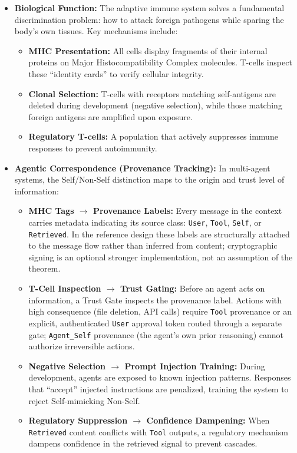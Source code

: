 \begin{itemize}[leftmargin=*]
\item \textbf{Biological Function:} The adaptive immune system solves a fundamental discrimination problem: how to attack foreign pathogens while sparing the body's own tissues. Key mechanisms include:
\begin{itemize}
\item \textbf{MHC Presentation:} All cells display fragments of their internal proteins on Major Histocompatibility Complex molecules. T-cells inspect these ``identity cards'' to verify cellular integrity.
\item \textbf{Clonal Selection:} T-cells with receptors matching self-antigens are deleted during development (negative selection), while those matching foreign antigens are amplified upon exposure.
\item \textbf{Regulatory T-cells:} A population that actively suppresses immune responses to prevent autoimmunity.
\end{itemize}

\item \textbf{Agentic Correspondence (Provenance Tracking):} In multi-agent systems, the Self/Non-Self distinction maps to the origin and trust level of information:
\begin{itemize}
\item \textbf{MHC Tags $\to$ Provenance Labels:} Every message in the context carries metadata indicating its source class: \texttt{User}, \texttt{Tool}, \texttt{Self}, or \texttt{Retrieved}. In the reference design these labels are structurally attached to the message flow rather than inferred from content; cryptographic signing is an optional stronger implementation, not an assumption of the theorem.
\item \textbf{T-Cell Inspection $\to$ Trust Gating:} Before an agent acts on information, a Trust Gate inspects the provenance label. Actions with high consequence (file deletion, API calls) require \texttt{Tool} provenance or an explicit, authenticated \texttt{User} approval token routed through a separate gate; \texttt{Agent\_Self} provenance (the agent's own prior reasoning) cannot authorize irreversible actions.
\item \textbf{Negative Selection $\to$ Prompt Injection Training:} During development, agents are exposed to known injection patterns. Responses that ``accept'' injected instructions are penalized, training the system to reject Self-mimicking Non-Self.
\item \textbf{Regulatory Suppression $\to$ Confidence Dampening:} When \texttt{Retrieved} content conflicts with \texttt{Tool} outputs, a regulatory mechanism dampens confidence in the retrieved signal to prevent cascades.
\end{itemize}


\end{itemize}
